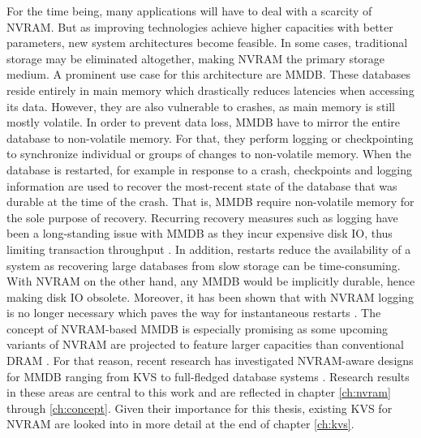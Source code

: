 For the time being, many applications will have to deal with a scarcity of
\ac{NVRAM}. But as improving technologies achieve higher capacities with better
parameters, new system architectures become feasible. In some cases, traditional
storage may be eliminated altogether, making \ac{NVRAM} the primary storage
medium. A prominent use case for this architecture are \ac{MMDB}. These
databases reside entirely in main memory which drastically reduces latencies
when accessing its data. However, they are also vulnerable to crashes, as main
memory is still mostly volatile. In order to prevent data loss, \ac{MMDB} have
to mirror the entire database to non-volatile memory. For that, they perform
logging or checkpointing to synchronize individual or groups of changes to
non-volatile memory. When the database is restarted, for example in response to
a crash, checkpoints and logging information are used to recover the most-recent
state of the database that was durable at the time of the crash. That is,
\ac{MMDB} require non-volatile memory for the sole purpose of recovery.
Recurring recovery measures such as logging have been a long-standing issue with
\ac{MMDB} as they incur expensive disk \ac{IO}, thus limiting transaction
throughput \cite{eich1986main, molina1992main, wust2012efficient,
malviya2014rethinking}. In addition, restarts reduce the availability of a
system as recovering large databases from slow storage can be time-consuming.
With \ac{NVRAM} on the other hand, any \ac{MMDB} would be implicitly durable,
hence making disk \ac{IO} obsolete. Moreover, it has been shown that with
\ac{NVRAM} logging is no longer necessary which paves the way for instantaneous
restarts \cite{oukid2015instant}. The concept of \ac{NVRAM}-based \ac{MMDB} is
especially promising as some upcoming variants of \ac{NVRAM} are projected to
feature larger capacities than conventional \ac{DRAM} \cite{lee2009architecting,
zilberberg2013phase, dulloor2014system}. For that reason, recent research has
investigated \ac{NVRAM}-aware designs for \ac{MMDB} ranging from \ac{KVS}
\cite{bailey2013exploring, zhou2016nvht, wu2016nvmcached} to full-fledged
database systems \cite{oukid2015instant, schwalb2016hyrise, andrei2017sap}.
Research results in these areas are central to this work and are reflected in
chapter \ref{ch:nvram} through \ref{ch:concept}. Given their importance for this
thesis, existing \ac{KVS} for \ac{NVRAM} are looked into in more detail at the
end of chapter \ref{ch:kvs}.

